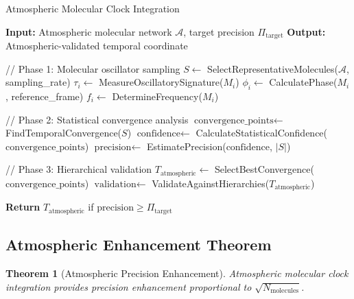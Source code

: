 \documentclass[12pt,a4paper]{article}
\newtheorem{theorem}{Theorem}
\begin{document}
\begin{algorithm}
\caption{Atmospheric Molecular Clock Integration}
\begin{algorithmic}
\State \textbf{Input:} Atmospheric molecular network $\mathcal{A}$, target precision $\Pi_{\text{target}}$
\State \textbf{Output:} Atmospheric-validated temporal coordinate

\State // Phase 1: Molecular oscillator sampling
\State $S \leftarrow$ SelectRepresentativeMolecules($\mathcal{A}$, sampling\_rate)
    \State $\tau_i \leftarrow$ MeasureOscillatorySignature($M_i$)
    \State $\phi_i \leftarrow$ CalculatePhase($M_i$, reference\_frame)
    \State $f_i \leftarrow$ DetermineFrequency($M_i$)
\EndFor

\State // Phase 2: Statistical convergence analysis
\State $\text{convergence\_points} \leftarrow$ FindTemporalConvergence($S$)
\State $\text{confidence} \leftarrow$ CalculateStatisticalConfidence($\text{convergence\_points}$)
\State $\text{precision} \leftarrow$ EstimatePrecision($\text{confidence}$, $|S|$)

\State // Phase 3: Hierarchical validation
\State $T_{\text{atmospheric}} \leftarrow$ SelectBestConvergence($\text{convergence\_points}$)
\State $\text{validation} \leftarrow$ ValidateAgainstHierarchies($T_{\text{atmospheric}}$)

\State \textbf{Return} $T_{\text{atmospheric}}$ if $\text{precision} \geq \Pi_{\text{target}}$
\end{algorithmic}
\end{algorithm}

\subsection{Atmospheric Enhancement Theorem}

\begin{theorem}[Atmospheric Precision Enhancement]
Atmospheric molecular clock integration provides precision enhancement proportional to $\sqrt{N_{\text{molecules}}}$.
\end{theorem}
\end{document}
